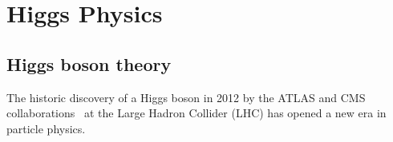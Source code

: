 \section{Higgs Physics}
\label{sec:physics}

\subsection{Higgs boson theory}

The historic discovery of a Higgs boson in 2012 by the ATLAS and CMS collaborations~\cite{atlas:2012obs,cms:2012obs}  at the Large Hadron Collider (LHC)  has opened a new era in particle physics. 
